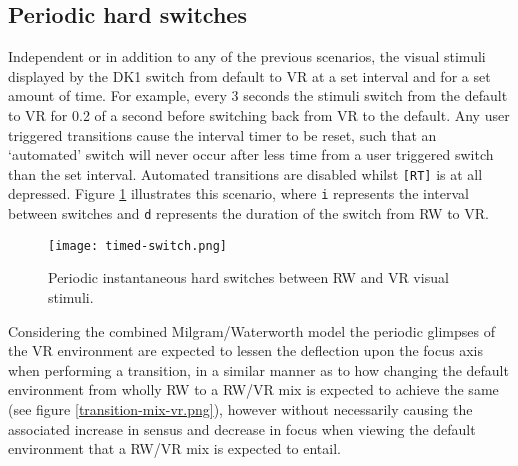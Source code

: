 


\subsection{Periodic hard switches}
\label{subsub-periodic}
Independent or in addition to any of the previous scenarios, the visual stimuli displayed by the DK1 switch from default to VR at a set interval and for a set amount of time. For example, every 3 seconds the stimuli switch from the default to VR for 0.2 of a second before switching back from VR to the default. Any user triggered transitions cause the interval timer to be reset, such that an `automated' switch will never occur after less time from a user triggered switch than the set interval. Automated transitions are disabled whilst \texttt{[RT]} is at all depressed. Figure \ref{scenariotimed} illustrates this scenario, where \texttt{i} represents the interval between switches and \texttt{d} represents the duration of the switch from RW to VR.

\begin{figure}[h]
	\begin{center}
		\texttt{[image: timed-switch.png]}
		\caption{Periodic instantaneous hard switches between RW and VR visual stimuli.}
		\label{scenariotimed}
	\end{center}
\end{figure}

Considering the combined Milgram/Waterworth model the periodic glimpses of the VR environment are expected to lessen the deflection upon the focus axis when performing a transition, in a similar manner as to how changing the default environment from wholly RW to a RW/VR mix is expected to achieve the same (see figure \ref{transition-mix-vr.png}), however without necessarily causing the associated increase in sensus and decrease in focus when viewing the default environment that a RW/VR mix is expected to entail.


